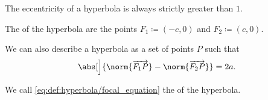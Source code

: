\begin{definition}
\begin{thmenum}
    The eccentricity of a hyperbola is always strictly greater than \( 1 \).

     The  of the hyperbola are the points \( F_1 \coloneqq (-c, 0) \) and \( F_2 \coloneqq (c, 0) \).

     We can also describe a hyperbola as a set of points \( P \) such that
    \begin{equation}\label{eq:def:hyperbola/focal_equation}
      \abs[\Big]{ \norm{\vect{F_1 P}} - \norm{\vect{F_2 P}} } = 2a.
    \end{equation}

    We call \eqref{eq:def:hyperbola/focal_equation} the  of the hyperbola.
  \end{thmenum}
\end{definition}
